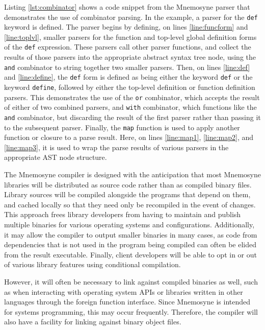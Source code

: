 \documentclass[11pt,a4paper]{article}
\theoremstyle{break}
\begin{document}
\FloatBarrier
Listing \ref{lst:combinator} shows a code snippet from the Mnemosyne parser that demonstrates the use of combinator parsing. In the example, a parser for the \texttt{def} keyword is defined. The parser begins by defining, on lines \ref{line:funcform} and \ref{line:toplvl}, smaller parsers for the function and top-level global definition forms of the \texttt{def} expression. These parsers call other parser functions, and collect the results of those parsers into the appropriate abstract syntax tree node, using the \texttt{and} combinator to string together two smaller parsers. Then, on lines \ref{line:def} and \ref{line:define}, the \texttt{def} form is defined as being either the keyword \texttt{def} or the keyword \texttt{define}, followed by either the top-level definition or function definition parsers. This demonstrates the use of the \texttt{or} combinator, which accepts the result of either of two combined parsers, and \texttt{with} combinator, which functions like the \texttt{and} combinator, but discarding the result of the first parser rather than passing it to the subsequent parser. Finally, the \texttt{map} function is used to apply another function or closure to a parse result. Here, on lines \ref{line:map1}, \ref{line:map2}, and \ref{line:map3}, it is used to wrap the parse results of various parsers in the appropriate AST node structure.

The Mnemosyne compiler is designed with the anticipation that most Mnemosyne libraries will be distributed as source code rather than as compiled binary files. Library sources will be compiled alongside the programs that depend on them, and cached locally so that they need only be recompiled in the event of changes. This approach frees library developers from having to maintain and publish multiple binaries for various operating systems and configurations. Additionally, it may allow the compiler to output smaller binaries in many cases, as code from dependencies that is not used in the program being compiled can often be elided from the result executable. Finally, client developers will be able to opt in or out of various library features using conditional compilation.

However, it will often be necessary to link against compiled binaries as well, such as when interacting with operating system APIs or libraries written in other languages through the foreign function interface. Since Mnemosyne is intended for systems programming, this may occur frequently. Therefore, the compiler will also have a facility for linking against binary object files.
\end{document}
